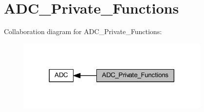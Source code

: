 \hypertarget{group___a_d_c___private___functions}{}\section{A\+D\+C\+\_\+\+Private\+\_\+\+Functions}
\label{group___a_d_c___private___functions}
Collaboration diagram for A\+D\+C\+\_\+\+Private\+\_\+\+Functions\+:
\nopagebreak
\begin{figure}[H]
\begin{center}
\leavevmode
\includegraphics[width=272pt]{group___a_d_c___private___functions}
\end{center}
\end{figure}
